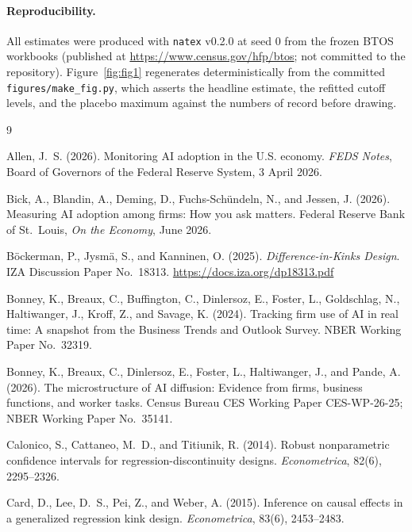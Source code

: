 \documentclass[11pt]{article}
\newcommand{\natex}{\texttt{natex}}
\begin{document}
\paragraph{Reproducibility.} All estimates were produced with \natex{}
v0.2.0 \cite{natex} at seed 0 from the frozen BTOS workbooks (published at
\url{https://www.census.gov/hfp/btos}; not committed to the repository).
Figure~\ref{fig:fig1} regenerates deterministically from the committed
\texttt{figures/make\_fig.py}, which asserts the headline estimate, the
refitted cutoff levels, and the placebo maximum against the numbers of
record before drawing.

\footnotesize
\begin{thebibliography}{9}
\setlength{\itemsep}{2pt}\setlength{\parskip}{0pt}

Allen, J.~S. (2026).
Monitoring AI adoption in the U.S. economy.
\emph{FEDS Notes}, Board of Governors of the Federal Reserve System, 3 April
2026.

Bick, A., Blandin, A., Deming, D., Fuchs-Sch\"undeln, N., and Jessen, J.
(2026).
Measuring AI adoption among firms: How you ask matters.
Federal Reserve Bank of St.\ Louis, \emph{On the Economy}, June 2026.

B\"ockerman, P., Jysm\"a, S., and Kanninen, O. (2025).
\emph{Difference-in-Kinks Design}.
IZA Discussion Paper No.~18313.
\url{https://docs.iza.org/dp18313.pdf}

Bonney, K., Breaux, C., Buffington, C., Dinlersoz, E., Foster, L., Goldschlag,
N., Haltiwanger, J., Kroff, Z., and Savage, K. (2024).
Tracking firm use of AI in real time: A snapshot from the Business Trends and
Outlook Survey.
NBER Working Paper No.~32319.

Bonney, K., Breaux, C., Dinlersoz, E., Foster, L., Haltiwanger, J., and
Pande, A. (2026).
The microstructure of AI diffusion: Evidence from firms, business functions,
and worker tasks.
Census Bureau CES Working Paper CES-WP-26-25; NBER Working Paper No.~35141.

Calonico, S., Cattaneo, M.~D., and Titiunik, R. (2014).
Robust nonparametric confidence intervals for regression-discontinuity
designs.
\emph{Econometrica}, 82(6), 2295--2326.

Card, D., Lee, D.~S., Pei, Z., and Weber, A. (2015).
Inference on causal effects in a generalized regression kink design.
\emph{Econometrica}, 83(6), 2453--2483.


\end{thebibliography}
\end{document}
